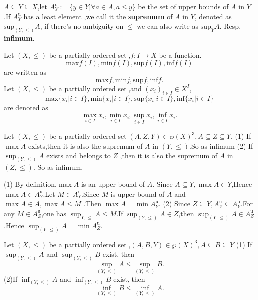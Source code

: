 \documentclass{book}
\numberwithin{equation}{section}
\begin{document}
\begin{definitionenv}
    $A\subseteq Y\subseteq X$,let $A_Y^\mathrm{u}:=\{y\in Y|\forall a\in A,a\le y\}$ be the set of upper bounds of $A$ in $Y$.If $A_Y^\mathrm{u}$ has a least element ,we call it the \textbf{supremum} of $A$ in $Y$, denoted as $\mathrm{sup}_{(Y,\le)}A$, if there's no ambiguity on $\le$ we can also write as $\mathrm{sup}_{Y}A$. Resp. \textbf{infimum}.
\end{definitionenv}
\begin{notationenv}\label{notation4.5.1}
    
         Let $(X,\le)$ be a partially ordered set ,$f:I\rightarrow X$ be a function.$$\mathrm{max}f(I),\mathrm{min}f(I),\mathrm{sup}f(I),\mathrm{inf}f(I)$$ are written as $$\mathrm{max}f,\mathrm{min}f,\mathrm{sup}f,\mathrm{inf}f.$$
         Let $(X,\le)$ be a partially ordered set ,and $(x_i)_{i\in I}\in X^I$,$$\mathrm{max}\{x_i|i\in I\},\mathrm{min}\{x_i|i\in I\},\mathrm{sup}\{x_i|i\in I\},\mathrm{inf}\{x_i|i\in I\}$$ are denoted as $$\max _{i\in I}x_i,\min _{i\in I}x_i,\sup _{i\in I}x_i,\inf _{i\in I}x_i.$$
    
\end{notationenv}
\begin{propositionenv}\label{proposition4.5.1}
    \quad
    \newline
    Let $(X,\le)$ be a partially ordered set $(A,Z,Y)\in \wp (X)^3,A\subseteq Z\subseteq Y$.
    \newline
   (1) If $\max A$ exists,then it is also the supremum of $A$ in $(Y,\le)$.So as infimum
    \newline
    (2) If $\sup_{(Y,\le)}A$ exists and belongs to $Z$ ,then it is also the supremum of $A$ in $(Z,\le)$. So as infimum.
\end{propositionenv}
\begin{proofenv}
    \quad \newline
   (1) By definition,$\max A $ is an upper bound of $A$. Since $A\subseteq Y, \max A \in Y$,Hence $\max A\in A_Y^\mathrm{u}$.Let $M\in A_Y^\mathrm{u} $.Since $M$ is upper bound of $A$ and $\max A\in A,\max A\le M$ .Then $\max A=\min A_Y^\mathrm{u}$.
\newline
(2) Since $Z\subseteq Y,A_Z^\mathrm{u}\subseteq A_Y^\mathrm{u}$.For any $M\in A_Z^\mathrm{u}$,one has $\sup _{Y,\le}A\le M$.If $\sup_{(Y,\le)}A\in Z$,then $\sup_{(Y,\le)}A\in A_Z^\mathrm{u}$.Hence $\sup _{(Y,\le)}A=\min A_Z^\mathrm{u}$.
\end{proofenv}
\begin{propositionenv}\label{proposition4.5.2}
    \quad
    \newline
    Let $(X,\le )$ be a partially ordered set ,$(A,B,Y)\in \wp (X)^3,A\subseteq B\subseteq Y$
    \newline
    (1) If $\sup_{(Y,\le)}A$ and $\sup_{(Y,\le)}B$ exist, then $$\sup_{(Y,\le)}A \le \sup_{(Y,\le)}B.$$
    \newline
    (2)If $\inf_{(Y,\le)}A$ and $\inf_{(Y,\le)}B$ exist, then $$\inf_{(Y,\le)}B \le \inf_{(Y,\le)}A.$$
    
\end{propositionenv}
\end{document}
